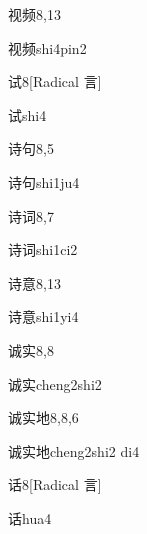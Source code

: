 \begin{entry}{视频}{8,13}
  \begin{phonetics}{视频}{shi4pin2}
  \end{phonetics}
\end{entry}

\begin{entry}{试}{8}[Radical 言]
  \begin{phonetics}{试}{shi4}
  \end{phonetics}
\end{entry}

\begin{entry}{诗句}{8,5}
  \begin{phonetics}{诗句}{shi1ju4}
  \end{phonetics}
\end{entry}

\begin{entry}{诗词}{8,7}
  \begin{phonetics}{诗词}{shi1ci2}
  \end{phonetics}
\end{entry}

\begin{entry}{诗意}{8,13}
  \begin{phonetics}{诗意}{shi1yi4}
  \end{phonetics}
\end{entry}

\begin{entry}{诚实}{8,8}
  \begin{phonetics}{诚实}{cheng2shi2}
  \end{phonetics}
\end{entry}

\begin{entry}{诚实地}{8,8,6}
  \begin{phonetics}{诚实地}{cheng2shi2 di4}
  \end{phonetics}
\end{entry}

\begin{entry}{话}{8}[Radical 言]
  \begin{phonetics}{话}{hua4}
  \end{phonetics}
\end{entry}

